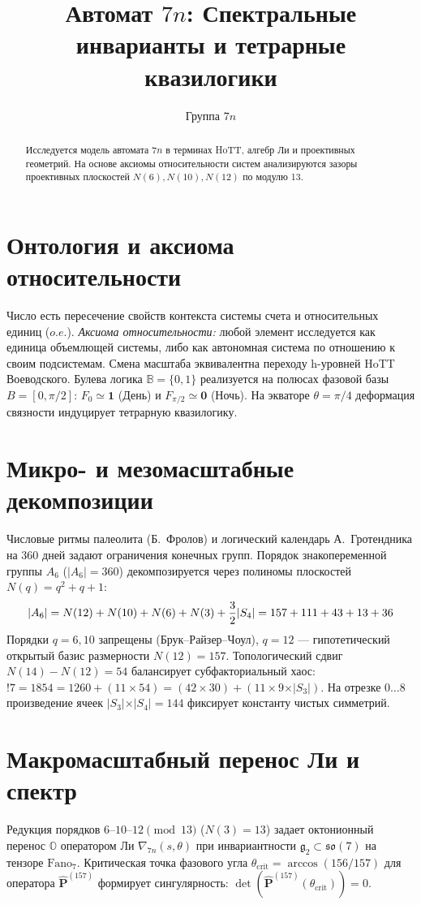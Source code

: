 \documentclass[10pt,twocolumn,fleqn]{article}
\title{\vspace{-4ex}\small\bf Автомат $7n$: Спектральные инварианты и тетрарные квазилогики}
\author{\small Группа $7n$}\date{\vspace{-9ex}}
\begin{document}
\maketitle

\begin{abstract}
\tiny Исследуется модель автомата $7n$ в терминах HoTT, алгебр Ли и проективных геометрий. На основе аксиомы относительности систем анализируются зазоры проективных плоскостей $N(6), N(10), N(12)$ по модулю 13.
\end{abstract}

\section{Онтология и аксиома относительности}
Число есть пересечение свойств контекста системы счета и относительных единиц ($o.e.$). \textit{Аксиома относительности:} любой элемент исследуется как единица объемлющей системы, либо как автономная система по отношению к своим подсистемам. Смена масштаба эквивалентна переходу h-уровней HoTT Воеводского. Булева логика $\mathbb{B}=\{0,1\}$ реализуется на полюсах фазовой базы $B=[0, \pi/2]$: $F_0 \simeq \mathbf{1}$ (День) и $F_{\pi/2} \simeq \mathbf{0}$ (Ночь). На экваторе $\theta = \pi/4$ деформация связности индуцирует тетрарную квазилогику.

\section{Микро- и мезомасштабные декомпозиции}
Числовые ритмы палеолита (Б.~Фролов) и логический календарь А.~Гротендника на 360 дней задают ограничения конечных групп. Порядок знакопеременной группы $A_6$ ($\vert A_6 \vert = 360$) декомпозируется через полиномы плоскостей $N(q) = q^2 + q + 1$:
\begin{equation}\small
    \vert A_6 \vert = N(12) + N(10) + N(6) + N(3) + \frac{3}{2}\vert S_4 \vert = 157 + 111 + 43 + 13 + 36
\end{equation}
Порядки $q=6,10$ запрещены (Брук--Райзер--Чоул), $q=12$ --- гипотетический открытый базис размерности $N(12)=157$. Топологический сдвиг $N(14) - N(12) = 54$ балансирует субфакториальный хаос: $!7 = 1854 = 1260 + (11 \times 54) = (42 \times 30) + (11 \times 9 \times \vert S_3 \vert)$. На отрезке $0 \dots 8$ произведение ячеек $\vert S_3 \vert \times \vert S_4 \vert = 144$ фиксирует константу чистых симметрий.

\section{Макромасштабный перенос Ли и спектр}
Редукция порядков $6\text{--}10\text{--}12 \pmod{13}$ ($N(3)=13$) задает октонионный перенос $\mathbb{O}$ оператором Ли $\nabla_{7n}(s, \theta)$ при инвариантности $\mathfrak{g}_2 \subset \mathfrak{so}(7)$ на тензоре $\text{Fano}_7$. Критическая точка фазового угла $\theta_{\text{crit}} = \arccos(156/157)$ для оператора $\hat{\mathbf{P}}^{(157)}$ формирует сингулярность: $\det(\hat{\mathbf{P}}^{(157)}(\theta_{\text{crit}})) = 0$. 
\end{document}
